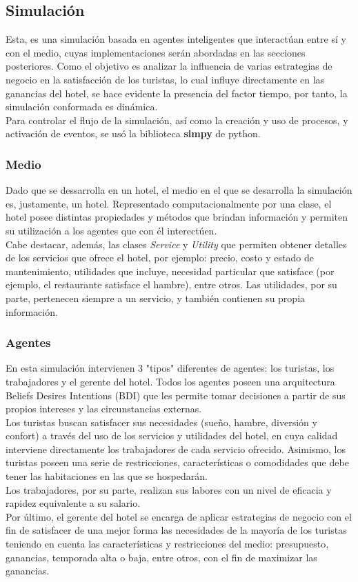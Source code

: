 \documentclass[12pt,a4paper]{article} \usepackage[spanish]{babel} \usepackage{graphicx} \usepackage{amsmath} \usepackage{amsfonts} \usepackage{amssymb} \usepackage{float} \usepackage{geometry}
\begin{document}
\subsection{Simulación}
Esta, es una simulación basada en agentes inteligentes que interactúan entre sí y con el medio, cuyas implementaciones serán abordadas en las secciones posteriores. Como el objetivo es analizar la influencia de varias estrategias de negocio en la satisfacción de los turistas, lo cual influye directamente en las ganancias del hotel, se hace evidente la presencia del factor tiempo, por tanto, la simulación conformada es dinámica.\\
Para controlar el flujo de la simulación, así como la creación y uso de procesos, y activación de eventos, se usó la biblioteca \textbf{simpy} de python.

\subsubsection{Medio}
Dado que se dessarrolla en un hotel, el medio en el que se desarrolla la simulación es, justamente, un hotel. Representado computacionalmente por una clase, el hotel posee distintas propiedades y métodos que brindan información y permiten su utilización a los agentes que con él interectúen.\\
Cabe destacar, además, las clases \textit{Service} y \textit{Utility} que permiten obtener detalles de los servicios que ofrece el hotel, por ejemplo: precio, costo y estado de mantenimiento, utilidades que incluye, necesidad particular que satisface (por ejemplo, el restaurante satisface el hambre), entre otros. Las utilidades, por su parte, pertenecen siempre a un servicio, y también contienen su propia información.

\subsubsection{Agentes}
En esta simulación intervienen 3 "tipos" diferentes de agentes: los turistas, los trabajadores y el gerente del hotel. Todos los agentes poseen una arquitectura Beliefs Desires Intentions (BDI) que les permite tomar decisiones a partir de sus propios intereses y las circunstancias externas.\\ 
Los turistas buscan satisfacer sus necesidades (sueño, hambre, diversión y confort) a través del uso de los servicios y utilidades del hotel, en cuya calidad interviene directamente los trabajadores de cada servicio ofrecido. Asimismo, los turistas poseen una serie de restricciones, características o comodidades que debe tener las habitaciones en las que se hospedarán.\\
Los trabajadores, por su parte, realizan sus labores con un nivel de eficacia y rapidez equivalente a su salario.\\
Por último, el gerente del hotel se encarga de aplicar estrategias de negocio con el fin de satisfacer de una mejor forma las necesidades de la mayoría de los turistas teniendo en cuenta las características y restricciones del medio: presupuesto, ganancias, temporada alta o baja, entre otros, con el fin de maximizar las ganancias.
\end{document}
